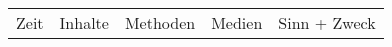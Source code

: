\documentclass[%
fontsize=12pt,
paper=a4,
oneside,
DIV=11,
BCOR=0cm,
pagesize=automedia,
parskip=false,
headings=normal,
titlepage=true%
]{scrartcl}
\begin{document}
\begin{longtable}{c|c|c|c|c}
Zeit & Inhalte & Methoden & Medien & Sinn + Zweck
\hline
\end{longtable}
\end{document}
